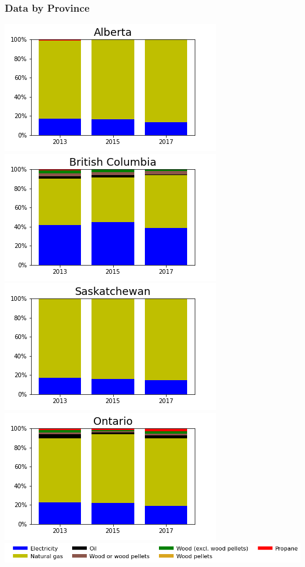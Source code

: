 \documentclass{beamer}
\begin{document}
\begin{frame}
\frametitle{Data by Province}
\vspace{-10pt}
\begin{center}
\includegraphics[width=0.48\linewidth]{ab.png}%
\includegraphics[width=0.48\linewidth]{bc.png}\\
\includegraphics[width=0.48\linewidth]{sk.png}%
\includegraphics[width=0.48\linewidth]{on.png}\\
\includegraphics[width=0.9\linewidth]{leg_bar.png}
\end{center}
\end{frame}
\end{document}
